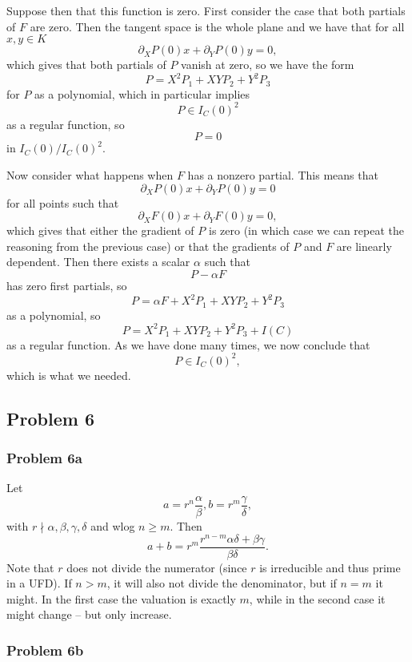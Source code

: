 Suppose then that this function is zero. First consider the case that both
partials of \( F \) are zero. Then the tangent space is the whole plane and
we have that for all \( x, y \in K \)
\[ 
    \partial_X P(0) x + \partial_Y P(0) y = 0,
\]
which gives that both partials of \( P \) vanish at zero, so we have the form
\[ 
    P = X^2 P_1 + XY P_2 + Y^2 P_3 
\]
for \( P \) as a polynomial, which in particular implies
\[ 
    P \in I_C(0)^2  
\]
as a regular function, so
\[ 
    P = 0 
\]
in \( I_C(0)/I_C(0)^2 \). 

Now consider what happens when \( F \) has a nonzero partial. This means that
\[ 
    \partial_X P(0) x + \partial_Y P(0) y = 0
\]
for all points such that
\[ 
    \partial_X F(0) x + \partial_Y F(0) y = 0,
\]
which gives that either the gradient of \( P \) is zero (in which case we can
repeat the reasoning from the previous case) or that the gradients of \( P \)
and \( F \) are linearly dependent. Then there exists a scalar \( \alpha \)
such that
\[ 
    P - \alpha F 
\]
has zero first partials, so
\[ 
    P = \alpha F + X^2 P_1 + XY P_2 + Y^2 P_3
\]
as a polynomial, so
\[ 
    P = X^2 P_1 + XY P_2 + Y^2 P_3 + I(C)
\]
as a regular function. As we have done many times, we now conclude that
\[ 
    P \in I_C(0)^2,
\]
which is what we needed.

\subsection*{Problem 6}

\subsubsection*{Problem 6a}

Let
\[ 
    a = r^n \frac{\alpha}{\beta}, b = r^m \frac{\gamma}{\delta},
\]
with \( r \nmid \alpha, \beta, \gamma, \delta \) and wlog \( n \geqslant m \). Then
\[ 
    a + b = r^m \frac{r^{n-m}\alpha\delta + \beta\gamma}{\beta\delta}.
\]
Note that \( r \) does not divide the numerator (since \( r \) is irreducible
and thus prime in a UFD). If \( n > m \), it will also not divide the denominator,
but if \( n = m \) it might. In the first case the valuation is exactly \( m \),
while in the second case it might change -- but only increase.

\subsubsection*{Problem 6b}

